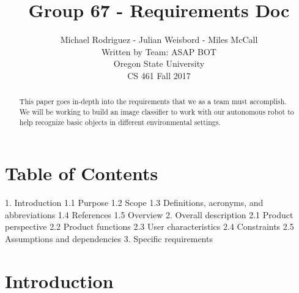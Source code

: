\documentclass[draftclsnofoot, onecolumn, 10pt, compsoc]{IEEEtran}
\title{Group 67 - Requirements Doc}
\author{
			Michael Rodriguez - Julian Weisbord - Miles McCall \\
			Written by Team: ASAP BOT \\
        	Oregon State University \\
        	CS 461 Fall 2017
       }
\newcommand\tab[1][1cm]{\hspace*{#1}}
\begin{document}
\maketitle

\begin{abstract}
This paper goes in-depth into the requirements that we as a team must accomplish. We will be working to build an image classifier to work with our autonomous robot to help recognize basic objects in different environmental settings. 
\end{abstract}
\newpage

\section*{Table of Contents}
\tab 1. Introduction \newline
      \tab\tab 1.1 Purpose \newline
      \tab\tab 1.2 Scope \newline
      \tab\tab 1.3 Definitions, acronyms, and abbreviations \newline
      \tab\tab 1.4 References \newline
      \tab\tab 1.5 Overview \newline
\tab 2. Overall description \newline
      \tab\tab 2.1 Product perspective \newline
      \tab\tab 2.2 Product functions \newline
      \tab\tab 2.3 User characteristics \newline
      \tab\tab 2.4 Constraints \newline
      \tab\tab 2.5 Assumptions and dependencies \newline
\tab 3. Specific requirements \newline
\newpage

\section{Introduction}
\end{document}
